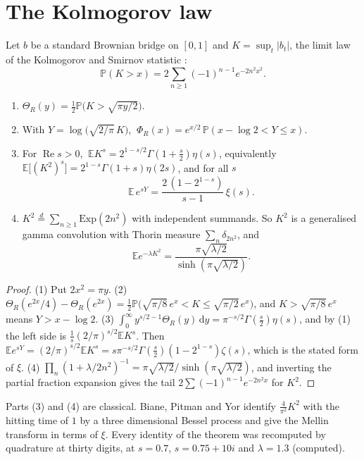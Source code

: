 \section{The Kolmogorov law}\label{kr:sec:kolm}
Let $b$ be a standard Brownian bridge on $[0,1]$ and $K=\sup_t|b_t|$, the limit law of the Kolmogorov and Smirnov statistic \cite{Kolmogorov33}:
\[
\mathbb P(K>x)=2\sum_{n\ge1}(-1)^{n-1}e^{-2n^2x^2}.
\]
\begin{theorem}\label{kr:thm:kolm}
\begin{enumerate}
\item $\Theta_R(y)=\frac12\mathbb P\big(K>\sqrt{\pi y/2}\big)$.
\item With $Y=\log\big(\sqrt{2/\pi}\,K\big)$, $\ \Phi_R(x)=e^{x/2}\,\mathbb P(x-\log2<Y\le x)$.
\item For $\operatorname{Re}s>0$, $\ \mathbb EK^s=2^{1-s/2}\Gamma(1+\frac s2)\eta(s)$, equivalently $\mathbb E\big[(K^2)^s\big]=2^{1-s}\Gamma(1+s)\eta(2s)$, and for all $s$
\[
\mathbb E\,e^{sY}=\frac{2\,(1-2^{1-s})}{s-1}\,\xi(s).
\]
\item $K^2\stackrel d=\sum_{n\ge1}\mathrm{Exp}(2n^2)$ with independent summands. So $K^2$ is a generalised gamma convolution with Thorin measure $\sum_n\delta_{2n^2}$, and
\[
\mathbb Ee^{-\lambda K^2}=\frac{\pi\sqrt{\lambda/2}}{\sinh(\pi\sqrt{\lambda/2})}.
\]
\end{enumerate}
\end{theorem}
\begin{proof}
(1) Put $2x^2=\pi y$. (2) $\Theta_R(e^{2x}/4)-\Theta_R(e^{2x})=\frac12\mathbb P\big(\sqrt{\pi/8}\,e^x<K\le\sqrt{\pi/2}\,e^x\big)$, and $K>\sqrt{\pi/8}\,e^x$ means $Y>x-\log2$. (3) $\int_0^\infty y^{s/2-1}\Theta_R(y)\,\mathrm dy=\pi^{-s/2}\Gamma(\frac s2)\eta(s)$, and by (1) the left side is $\frac1s(2/\pi)^{s/2}\mathbb EK^s$. Then $\mathbb Ee^{sY}=(2/\pi)^{s/2}\mathbb EK^s=s\pi^{-s/2}\Gamma(\frac s2)(1-2^{1-s})\zeta(s)$, which is the stated form of $\xi$. (4) $\prod_n(1+\lambda/2n^2)^{-1}=\pi\sqrt{\lambda/2}/\sinh(\pi\sqrt{\lambda/2})$, and inverting the partial fraction expansion gives the tail $2\sum(-1)^{n-1}e^{-2n^2x}$ for $K^2$.
\end{proof}
Parts (3) and (4) are classical. Biane, Pitman and Yor \cite{BPY01} identify $\frac4{\pi^2}K^2$ with the hitting time of $1$ by a three dimensional Bessel process and give the Mellin transform in terms of $\xi$. Every identity of the theorem was recomputed by quadrature at thirty digits, at $s=0.7$, $s=0.75+10i$ and $\lambda=1.3$ (computed).

